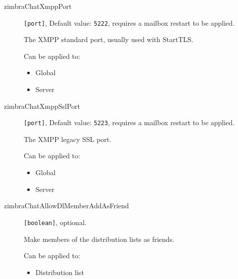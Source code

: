 \begin{description}
\item [zimbraChatXmppPort] \verb![port]!, Default value: \verb!5222!, requires a mailbox restart to be applied.

The XMPP standard port, usually used with StartTLS.

Can be applied to:
\begin{itemize}
\item Global
\item Server
\end{itemize}

\item [zimbraChatXmppSslPort] \verb![port]!, Default value: \verb!5223!, requires a mailbox restart to be applied.

The XMPP legacy SSL port.

Can be applied to:
\begin{itemize}
\item Global
\item Server
\end{itemize}

\item [zimbraChatAllowDlMemberAddAsFriend] \verb![boolean]!, optional.

Make members of the distribution lists as friends.

Can be applied to:
\begin{itemize}
\item Distribution list
\end{itemize}

\end{description}
